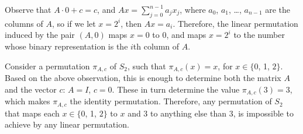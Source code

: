 Observe that $A\cdot0+c=c$, and $Ax=\sum_{j=0}^{n-1}a_jx_j$, where $a_0$, $a_1$, \dots, $a_{n-1}$ are the columns of $A$, so if we let $x=2^i$, then $Ax=a_i$.
Therefore, the linear permutation induced by the pair $(A,0)$ maps $x=0$ to $0$, and maps $x=2^i$ to the number whose binary representation is the $i$th column of $A$.

Consider a permutation $\pi_{A,c}$ of $S_2$, such that $\pi_{A,c}(x)=x$, for $x\in\{0$, 1, $2\}$.
Based on the above observation, this is enough to determine both the matrix $A$ and the vector $c$: $A=I$, $c=0$.
These in turn determine the value $\pi_{A,c}(3)=3$, which makes $\pi_{A,c}$ the identity permutation.
Therefore, any permutation of $S_2$ that maps each $x\in\{0$, 1, $2\}$ to $x$ and 3 to anything else than 3, is impossible to achieve by any linear permutation.
